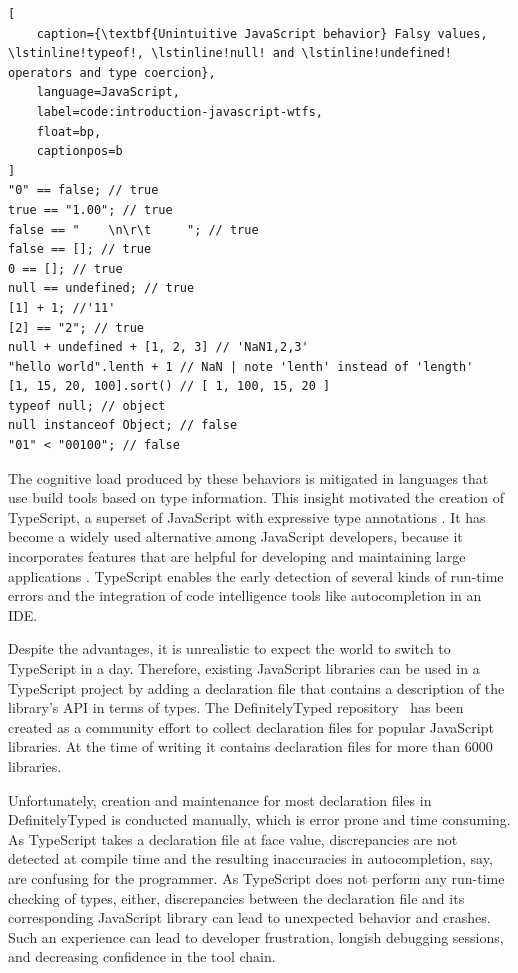 \documentclass[english,cleveref,autoref,submission]{programming}
\begin{document}
\begin{lstlisting}[
    caption={\textbf{Unintuitive JavaScript behavior} Falsy values, \lstinline!typeof!, \lstinline!null! and \lstinline!undefined! operators and type coercion},
    language=JavaScript,
	label=code:introduction-javascript-wtfs,
    float=bp,
    captionpos=b
]
"0" == false; // true
true == "1.00"; // true
false == "    \n\r\t     "; // true
false == []; // true
0 == []; // true
null == undefined; // true
[1] + 1; //'11'
[2] == "2"; // true
null + undefined + [1, 2, 3] // 'NaN1,2,3'
"hello world".lenth + 1 // NaN | note 'lenth' instead of 'length'
[1, 15, 20, 100].sort() // [ 1, 100, 15, 20 ]
typeof null; // object
null instanceof Object; // false
"01" < "00100"; // false
\end{lstlisting}

The cognitive load produced by these behaviors is mitigated in languages that use
build tools based on type information. This insight motivated the
creation of TypeScript, a superset of JavaScript with expressive type
annotations \cite{typescript}. It has become a widely used alternative
among JavaScript developers, because it incorporates features that are
helpful for developing and maintaining large applications
\cite{DBLP:conf/icse/GaoBB17}. TypeScript enables the early detection
of several kinds of run-time errors and the integration of code intelligence
tools like autocompletion in an IDE.

Despite the advantages, it is unrealistic to expect the world to
switch to TypeScript in a day. Therefore, 
existing JavaScript libraries can be used in a TypeScript project by
adding a declaration file that contains a description of the library's
API in terms of types. 
The DefinitelyTyped repository~\cite{definitely-typed-repository} has
been created as a community effort to collect declaration files for
popular JavaScript libraries. At the time of writing it contains
declaration files for more than 6000 libraries.

Unfortunately, creation and maintenance for most declaration
files in DefinitelyTyped is conducted manually,
which is error prone and time consuming. As TypeScript takes a
declaration file at face value, discrepancies are not detected at
compile time and the resulting inaccuracies in autocompletion, say,
are confusing for the programmer.
As TypeScript does not perform any run-time 
checking of types, either,  discrepancies  between the declaration file
and its corresponding JavaScript library can lead to unexpected 
behavior and crashes. Such an experience can lead to developer
frustration, longish debugging sessions, and decreasing confidence in
the tool chain.
\end{document}
